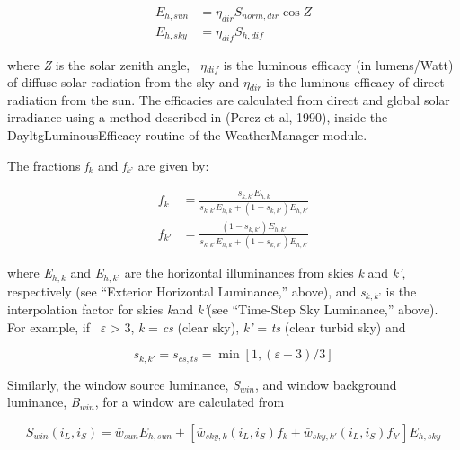 \begin{equation}
  \begin{array}{rl}
    E_{h,sun} & = \eta_{dir} S_{norm,dir} \cos Z \\
    E_{h,sky} & = \eta_{dif} S_{h,dif}
  \end{array}
\end{equation}

where \emph{Z} is the solar zenith angle,~ \emph{$\eta$\(_{dif}\)} is the luminous efficacy (in lumens/Watt) of diffuse solar radiation from the sky and \emph{$\eta$\(_{dir}\)} is the luminous efficacy of direct radiation from the sun. The efficacies are calculated from direct and global solar irradiance using a method described in (Perez et al, 1990), inside the DayltgLuminousEfficacy routine of the WeatherManager module.

The fractions \emph{f\(_{k}\)} and \emph{f\(_{k’}\)} are given by:

\begin{equation}
  \begin{array}{rl}
    f_k    & = \frac{ s_{k,k'} E_{h,k} } { s_{k,k'} E_{h,k} + (1 - s_{k,k'})E_{h,k'}} \\
    f_{k'} & = \frac{ (1 - s_{k,k'} ) E_{h,k'} } { s_{k,k'} E_{h,k} + (1 - s_{k,k'} ) E_{h,k'}}
  \end{array}
\end{equation}

where \emph{E\(_{h,k}\)} and \emph{E\(_{h,k’}\)} are the horizontal illuminances from skies \emph{k} and \emph{k'}, respectively (see ``Exterior Horizontal Luminance,'' above), and \emph{s\(_{k,k’}\)} is the interpolation factor for skies \emph{k}and \emph{k'}(see ``Time-Step Sky Luminance,'' above).~ For example, if~ \emph{$\varepsilon$} \textgreater{} 3, \emph{k} = \emph{cs} (clear sky), \emph{k'} = \emph{ts} (clear turbid sky) and

\begin{equation}
s_{k,k'} = s_{cs,ts} = \min [1,(\varepsilon - 3)/3]
\end{equation}

Similarly, the window source luminance, \emph{S\(_{win}\)}, and window background luminance, \emph{B\(_{win}\)}, for a window are calculated from

\begin{equation}
{S_{win}}({i_L},{i_S}) = {\bar w_{sun}}{E_{h,sun}} + [{\bar w_{sky,k}}({i_L},{i_S}){f_k} + {\bar w_{sky,k'}}({i_L},{i_S}){f_{k'}}]{E_{h,sky}}
\end{equation}


